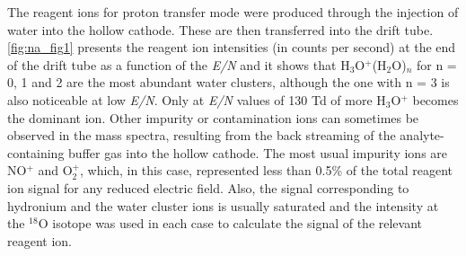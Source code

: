 The reagent ions for proton transfer mode were produced through the injection of water into the hollow cathode. These are then transferred into the drift tube. 
\autoref{fig:na_fig1} presents the reagent ion intensities (in counts per second) at the end of the drift tube as a function of the \textit{E/N} and it shows that H$_3$O$^+$(H$_2$O)$_n$ for n = 0, 1 and 2 are the most abundant water clusters, although the one with n = 3 is also noticeable at low \textit{E/N}.
Only at \textit{E/N} values of 130 Td of more  H$_3$O$^+$ becomes the dominant ion. 
Other impurity or contamination ions can sometimes be observed in the mass spectra, resulting from the back streaming of the analyte-containing buffer gas into the hollow cathode. The most usual impurity ions are NO$^+$ and O$_2^+$, which, in this case, represented less than 0.5\% of the total reagent ion signal for any reduced electric field. 
Also, the signal corresponding to hydronium and the water cluster ions is usually saturated and the intensity at the $^{18}$O isotope was used in each case to calculate the signal of the relevant reagent ion.




